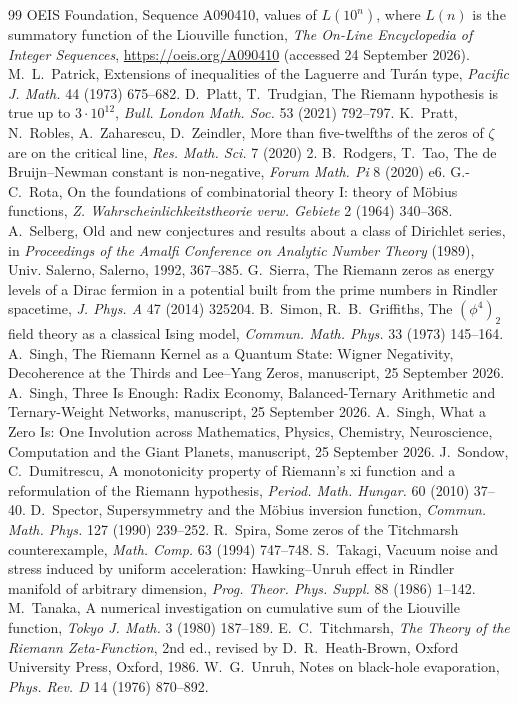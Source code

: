 \documentclass[11pt]{article}
\theoremstyle{definition}\newtheorem{definition}[theorem]{Definition}
\theoremstyle{remark}\newtheorem{remark}[theorem]{Remark}
\begin{document}
\begin{thebibliography}{99}
 OEIS Foundation, Sequence A090410, values of $L(10^n)$, where $L(n)$ is the summatory function of the Liouville function, \emph{The On-Line Encyclopedia of Integer Sequences}, \url{https://oeis.org/A090410} (accessed 24 September 2026).
 M.~L.~Patrick, Extensions of inequalities of the Laguerre and Tur\'an type, \emph{Pacific J. Math.} 44 (1973) 675--682.
 D.~Platt, T.~Trudgian, The Riemann hypothesis is true up to $3\cdot10^{12}$, \emph{Bull. London Math. Soc.} 53 (2021) 792--797.
 K.~Pratt, N.~Robles, A.~Zaharescu, D.~Zeindler, More than five-twelfths of the zeros of $\zeta$ are on the critical line, \emph{Res. Math. Sci.} 7 (2020) 2.
 B.~Rodgers, T.~Tao, The de Bruijn--Newman constant is non-negative, \emph{Forum Math. Pi} 8 (2020) e6.
 G.-C.~Rota, On the foundations of combinatorial theory I: theory of M\"obius functions, \emph{Z. Wahrscheinlichkeitstheorie verw. Gebiete} 2 (1964) 340--368.
 A.~Selberg, Old and new conjectures and results about a class of Dirichlet series, in \emph{Proceedings of the Amalfi Conference on Analytic Number Theory} (1989), Univ. Salerno, Salerno, 1992, 367--385.
 G.~Sierra, The Riemann zeros as energy levels of a Dirac fermion in a potential built from the prime numbers in Rindler spacetime, \emph{J. Phys. A} 47 (2014) 325204.
 B.~Simon, R.~B.~Griffiths, The $(\phi^4)_2$ field theory as a classical Ising model, \emph{Commun. Math. Phys.} 33 (1973) 145--164.
 A.~Singh, The Riemann Kernel as a Quantum State: Wigner Negativity, Decoherence at the Thirds and Lee--Yang Zeros, manuscript, 25 September 2026.
 A.~Singh, Three Is Enough: Radix Economy, Balanced-Ternary Arithmetic and Ternary-Weight Networks, manuscript, 25 September 2026.
 A.~Singh, What a Zero Is: One Involution across Mathematics, Physics, Chemistry, Neuroscience, Computation and the Giant Planets, manuscript, 25 September 2026.
 J.~Sondow, C.~Dumitrescu, A monotonicity property of Riemann's xi function and a reformulation of the Riemann hypothesis, \emph{Period. Math. Hungar.} 60 (2010) 37--40.
 D.~Spector, Supersymmetry and the M\"obius inversion function, \emph{Commun. Math. Phys.} 127 (1990) 239--252.
 R.~Spira, Some zeros of the Titchmarsh counterexample, \emph{Math. Comp.} 63 (1994) 747--748.
 S.~Takagi, Vacuum noise and stress induced by uniform acceleration: Hawking--Unruh effect in Rindler manifold of arbitrary dimension, \emph{Prog. Theor. Phys. Suppl.} 88 (1986) 1--142.
 M.~Tanaka, A numerical investigation on cumulative sum of the Liouville function, \emph{Tokyo J. Math.} 3 (1980) 187--189.
 E.~C.~Titchmarsh, \emph{The Theory of the Riemann Zeta-Function}, 2nd ed., revised by D.~R.~Heath-Brown, Oxford University Press, Oxford, 1986.
 W.~G.~Unruh, Notes on black-hole evaporation, \emph{Phys. Rev. D} 14 (1976) 870--892.
\end{thebibliography}
\end{document}
